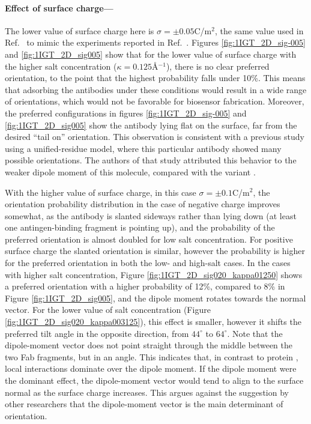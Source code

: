  \medskip
 
 \paragraph*{Effect of surface charge---}
 
The lower value of surface charge here is $\sigma=\pm 0.05$C/m$^2$, the same value used in Ref.~ to mimic the experiments reported in Ref.~. 
Figures \ref{fig:1IGT_2D_sig-005} and \ref{fig:1IGT_2D_sig005} show that for the lower value of surface charge with the higher salt concentration ($\kappa=0.125$\AA$^{-1}$), there is no clear preferred orientation, to the point that the highest probability falls under 10\%. 
This means that adsorbing the antibodies under these conditions would result in a wide range of orientations, which would not be favorable for biosensor fabrication.
Moreover, the preferred configurations in figures \ref{fig:1IGT_2D_sig-005} and \ref{fig:1IGT_2D_sig005} show the antibody lying flat on the surface, far from the desired ``tail on'' orientation. 
This observation is consistent with a previous study using a unified-residue model,\cite{ZhouChenJiang2003} where this particular antibody showed many possible orientations. 
The authors of that study attributed this behavior to the weaker dipole moment of this molecule, compared with the variant .
 
With the higher value of surface charge, in this case $\sigma=\pm0.1$C/m$^2$, the orientation probability distribution in the case of negative charge improves somewhat, as the antibody is slanted sideways rather than lying down (at least one antingen-binding fragment is pointing up), and the probability of the preferred orientation is almost doubled for low salt concentration.
For positive surface charge the slanted orientation is similar, however the probability is higher for the preferred orientation in both the low- and high-salt cases.
In the cases with higher salt concentration, Figure \ref{fig:1IGT_2D_sig020_kappa01250} shows a preferred orientation with a higher probability of 12\%, compared to 8\% in Figure \ref{fig:1IGT_2D_sig005}, and the dipole moment rotates towards the normal vector. 
For the lower value of salt concentration (Figure \ref{fig:1IGT_2D_sig020_kappa003125}), this effect is smaller, however it shifts the preferred tilt angle in the opposite direction, from $44^{\circ}$ to $64^{\circ}$. Note that the dipole-moment vector does not point straight through the middle between the two Fab fragments, but in an angle.
This indicates that, in contrast to protein \gb, local interactions dominate over the dipole moment. If the dipole moment were the dominant effect, the dipole-moment vector would tend to align to the surface normal as the surface charge increases.
This argues against the suggestion by other researchers\cite{ChenLiuZhouJiang2003,ZhouChenJiang2003} that the dipole-moment vector is the main determinant of orientation.
 
